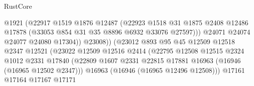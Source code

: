 \begin{lexlean}{RustCore}
\begin{coremodule}
                                            @1921
                                            (@22917
                                              @1519
                                              @1876
                                              @12487
                                              (@22923
                                                @1518
                                                @31
                                                @1875
                                                @2408
                                                @12486
                                                @17878
                                                (@33053 @854 @31 @35 @8896 @6932 @33076 @27597)))
                                            @24071
                                            @24074
                                            @24077
                                            @24080
                                            @17304))
                                        @23008))
                                    (@23012
                                      @893
                                      @95
                                      @45
                                      @12509
                                      @12518
                                      @2347
                                      @12521
                                      (@23022
                                        @12509
                                        @12516
                                        @2414
                                        (@22795
                                          @12508
                                          @12515
                                          @2324
                                          @1012
                                          @2331
                                          @17840
                                          (@22809
                                            @1607
                                            @2331
                                            @22815
                                            @17881
                                            @16963
                                            (@16946 (@16965 @12502 @2347)))
                                          @16963
                                          (@16946 (@16965 @12496 @12508)))
                                        @17161
                                        @17164
                                        @17167
                                        @17171

\end{coremodule}
\end{lexlean}
